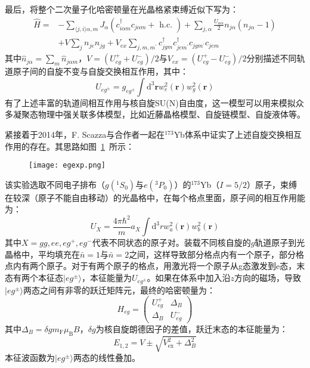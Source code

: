 最后，将整个二次量子化哈密顿量在光晶格紧束缚近似下写为：
\begin{equation}
\begin{aligned}
\hat{H}=&-\sum_{\langle j, i\rangle \alpha, m} J_{\alpha}\left(c_{i \alpha m}^{\dagger} c_{j \alpha m}+\text { h.c. }\right)+\sum_{j, \alpha} \frac{U_{\alpha \alpha}}{2} n_{j \alpha}\left(n_{j \alpha}-1\right) \\
&+V \sum_{j} n_{j e} n_{j g}+V_{e x} \sum_{j, m, m^{\prime}} c_{j g m}^{\dagger} c_{j e m^{\prime}}^{\dagger} c_{j g m^{\prime}} c_{j e m}
\end{aligned}
\end{equation}
其中$\hat{n}_{j\alpha}=\sum_m \hat{n}_{j\alpha m}$，$V=\left(U_{e g}^{+}+U_{e g}^{-}\right) / 2$与$V_{ex}=\left(U_{e g}^{+}-U_{e g}^{-}\right) / 2$分别描述不同轨道原子间的自旋不变与自旋交换相互作用，其中：
\begin{equation}
U_{eg^\pm} = g_{eg^\pm} \int \mathrm{d}^{3} \mathbf{r} w_e^2(\mathbf{r})w_g^2(\mathbf{r})
\end{equation}
有了上述丰富的轨道间相互作用与核自旋SU(N)自由度，这一模型可以用来模拟众多凝聚态物理中强关联多体模型，比如近藤晶格模型、自旋链模型、自旋液体等。

紧接着于2014年，F. Scazza\cite{scazza2014observation}与合作者一起在${}^{173}$Yb体系中证实了上述自旋交换相互作用的存在。其思路如图~\ref{egexp}~所示：
\begin{figure}[!htbp]
    \centering
    \texttt{[image: egexp.png]}
    \label{egexp}
\end{figure}
该实验选取不同电子排布（$g({}^1S_0)$与$e({}^3P_0)$）的${}^{173}$Yb（$I=5/2$）原子，束缚在较深（原子不能自由移动）的光晶格中，在每个格点里面，原子间的相互作用能为：
\begin{equation}
U_{X}=\frac{4 \pi \hbar^{2}}{m} a_{X} \int \mathrm{d}^{3} r w_{a}^{2}(\mathbf{r}) w_{b}^{2}(\mathbf{r})
\end{equation}
其中$X =gg, ee, eg^+, eg^−$代表不同状态的原子对。装载不同核自旋的$g$轨道原子到光晶格中，平均填充在$\bar{n}=1$与$\bar{n}=2$之间，这样导致部分格点内有一个原子，部分格点内有两个原子。对于有两个原子的格点，用激光将一个原子从g态激发到e态，末态有两个本征态$|eg^\pm\rangle$，本征能量为$U_{eg^\pm}$。如果在体系中加入沿$z$方向的磁场，导致$|eg^\pm\rangle$两态之间有非零的跃迁矩阵元，最终的哈密顿量为：
\begin{equation}
H_{e g}=\left(\begin{array}{cc}
U_{e g}^{+} & \Delta_{B} \\
\Delta_{B} & U_{e g}^{-}
\end{array}\right)
\end{equation}
其中$\Delta_{B}=\delta g m_{\mathrm{F}} \mu_{\mathrm{B}} B$，$\delta g$为核自旋朗德因子的差值，跃迁末态的本征能量为：
\begin{equation}
E_{1,2}=V \pm \sqrt{V_{\mathrm{ex}}^{2}+\Delta_{B}^{2}}
\end{equation}
本征波函数为$|eg^\pm\rangle$两态的线性叠加。

